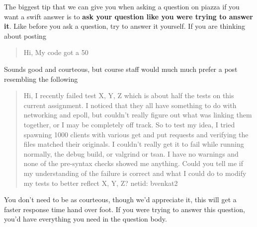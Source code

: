 The biggest tip that we can give you when asking a question on piazza if you want a swift answer is to \textbf{ask your question like you were trying to answer it}. Like before you ask a question, try to answer it yourself. If you are thinking about posting

\begin{quote}
Hi, My code got a 50%
\end{quote}

Sounds good and courteous, but course staff would much much prefer a post resembling the following

\begin{quote}
Hi, I recently failed test X, Y, Z which is about half the tests on this current assignment. I noticed that they all have something to do with networking and epoll, but couldn't really figure out what was linking them together, or I may be completely off track. So to test my idea, I tried spawning 1000 clients with various get and put requests and verifying the files matched their originals. I couldn't really get it to fail while running normally, the debug build, or valgrind or tsan. I have no warnings and none of the pre-syntax checks showed me anything. Could you tell me if my understanding of the failure is correct and what I could do to modify my tests to better reflect X, Y, Z? netid: bvenkat2
\end{quote}

You don't need to be as courteous, though we'd appreciate it, this will get a faster response time hand over foot. If you were trying to answer this question, you'd have everything you need in the question body.




